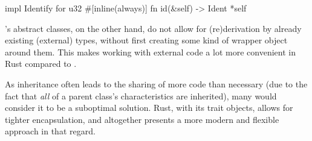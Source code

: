 \begin{rustblock}
  impl Identify for u32 {
    #[inline(always)]
    fn id(&self) -> Ident {
      *self
    }
  }
\end{rustblock}

\cpp's abstract classes,  on the other hand, do not  allow for (re)derivation by
already existing (external)  types, without first creating some  kind of wrapper
object around them. This makes working  with external code a lot more convenient
in Rust compared to \cpp.

As inheritance often  leads to the sharing  of more code than  necessary (due to
the fact that  \textit{all} of a parent class's  characteristics are inherited),
many  would consider  it  to be  a  suboptimal solution.  Rust,  with its  trait
objects, allows for tighter encapsulation, and altogether presents a more modern
and flexible approach in that regard.
